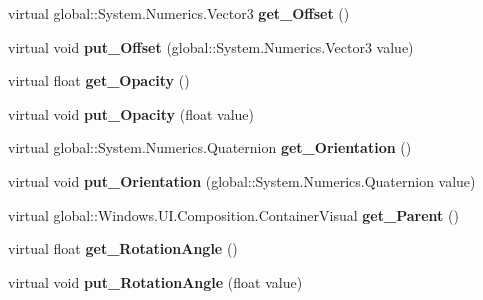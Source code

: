 \begin{DoxyCompactItemize}
virtual global\+::\+System.\+Numerics.\+Vector3 {\bfseries get\+\_\+\+Offset} ()
\item 
\mbox{\label{class_windows_1_1_u_i_1_1_composition_1_1_visual_a5ae1120de010788273be8a5ba125758b}} 
virtual void {\bfseries put\+\_\+\+Offset} (global\+::\+System.\+Numerics.\+Vector3 value)
\item 
\mbox{\label{class_windows_1_1_u_i_1_1_composition_1_1_visual_aefe015d14edbd0b01c59658d842ee6b6}} 
virtual float {\bfseries get\+\_\+\+Opacity} ()
\item 
\mbox{\label{class_windows_1_1_u_i_1_1_composition_1_1_visual_ac9c346d6488aba1731166730bd1abb6c}} 
virtual void {\bfseries put\+\_\+\+Opacity} (float value)
\item 
\mbox{\label{class_windows_1_1_u_i_1_1_composition_1_1_visual_a3cd98e040ae25a3b0e41adff6ce17cde}} 
virtual global\+::\+System.\+Numerics.\+Quaternion {\bfseries get\+\_\+\+Orientation} ()
\item 
\mbox{\label{class_windows_1_1_u_i_1_1_composition_1_1_visual_ab875fd373be5e98cf555fe044dfb879b}} 
virtual void {\bfseries put\+\_\+\+Orientation} (global\+::\+System.\+Numerics.\+Quaternion value)
\item 
\mbox{\label{class_windows_1_1_u_i_1_1_composition_1_1_visual_a26c62464881951a01cbced9fe2d055cf}} 
virtual global\+::\+Windows.\+U\+I.\+Composition.\+Container\+Visual {\bfseries get\+\_\+\+Parent} ()
\item 
\mbox{\label{class_windows_1_1_u_i_1_1_composition_1_1_visual_a46a0e2c6f7487264a8eb1652dd8716e6}} 
virtual float {\bfseries get\+\_\+\+Rotation\+Angle} ()
\item 
\mbox{\label{class_windows_1_1_u_i_1_1_composition_1_1_visual_a912ec0e9a447786e1502e1290aeb7f59}} 
virtual void {\bfseries put\+\_\+\+Rotation\+Angle} (float value)

\end{DoxyCompactItemize}
